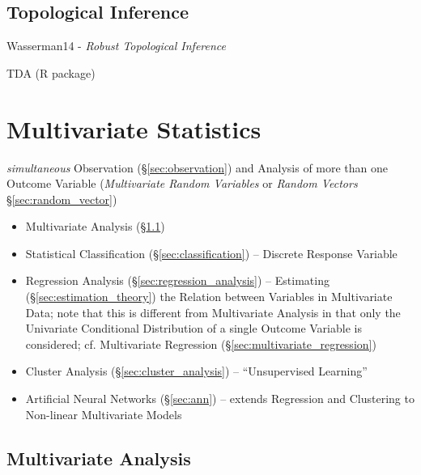 \subsection{Topological Inference}\label{sec:topological_inference}

Wasserman14 - \emph{Robust Topological Inference}

TDA (R package)



\section{Multivariate Statistics}\label{sec:multivariate_statistics}

\emph{simultaneous} Observation (\S\ref{sec:observation}) and Analysis of more
than one Outcome Variable (\emph{Multivariate Random Variables} or \emph{Random
  Vectors} \S\ref{sec:random_vector})

\begin{itemize}
  \item Multivariate Analysis (\S\ref{sec:multivariate_analysis})
  \item Statistical Classification (\S\ref{sec:classification})
    -- Discrete Response Variable
  \item Regression Analysis (\S\ref{sec:regression_analysis}) -- Estimating
    (\S\ref{sec:estimation_theory}) the Relation between Variables in
    Multivariate Data; note that this is different from Multivariate Analysis in
    that only the Univariate Conditional Distribution of a single Outcome
    Variable is considered; cf. Multivariate Regression
    (\S\ref{sec:multivariate_regression})
  \item Cluster Analysis (\S\ref{sec:cluster_analysis}) --
    ``Unsupervised Learning''
  \item Artificial Neural Networks (\S\ref{sec:ann}) -- extends Regression and
    Clustering to Non-linear Multivariate Models
\end{itemize}



\subsection{Multivariate Analysis}\label{sec:multivariate_analysis}

